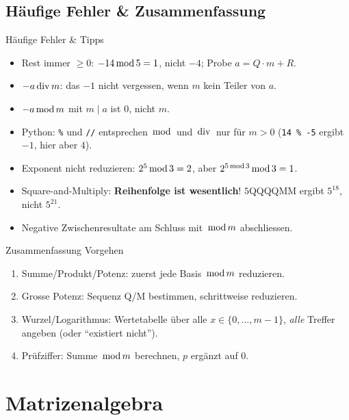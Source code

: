 \documentclass[a4paper, fontsize=7pt]{scrartcl}
\newcommand{\Div}{\mskip3mu\mathrm{div}\mskip3mu}
\newcommand{\Mod}{\mskip3mu\mathrm{mod}\mskip3mu}
\begin{document}
\subsection{Häufige Fehler \& Zusammenfassung}

\begin{subbox}{Häufige Fehler \& Tipps}
\begin{itemize}
    \item Rest immer $\ge 0$: $-14 \Mod 5 = 1$, nicht $-4$; Probe
          $a = Q \cdot m + R$.
    \item $-a \Div m$: das $-1$ nicht vergessen, wenn $m$ kein Teiler von $a$.
    \item $-a \Mod m$ mit $m \mid a$ ist $0$, nicht $m$.
    \item Python: \texttt{\%} und \texttt{//} entsprechen $\Mod$ und $\Div$ nur
          für $m > 0$ (\texttt{14 \% -5} ergibt $-1$, hier aber $4$).
    \item Exponent nicht reduzieren: $2^5 \Mod 3 = 2$, aber
          $2^{5 \Mod 3} \Mod 3 = 1$.
    \item Square-and-Multiply: \textbf{Reihenfolge ist wesentlich}!
          $5$QQQQMM ergibt $5^{18}$, nicht $5^{21}$.
    \item Negative Zwischenresultate am Schluss mit $\Mod m$ abschliessen.
\end{itemize}
\end{subbox}

\begin{subbox}{Zusammenfassung Vorgehen}
\begin{enumerate}
    \item Summe/Produkt/Potenz: zuerst jede Basis $\Mod m$ reduzieren.
    \item Grosse Potenz: Sequenz Q/M bestimmen, schrittweise reduzieren.
    \item Wurzel/Logarithmus: Wertetabelle über alle $x \in \{0, \ldots, m-1\}$,
          \emph{alle} Treffer angeben (oder ``existiert nicht'').
    \item Prüfziffer: Summe $\Mod m$ berechnen, $p$ ergänzt auf $0$.
\end{enumerate}
\end{subbox}

\section{Matrizenalgebra}
\end{document}

